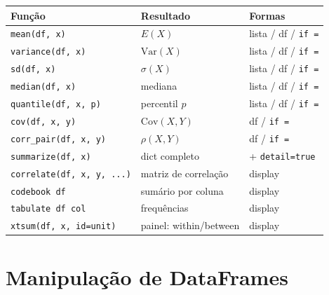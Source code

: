 \begin{center}
\begin{tabular}{lll}
\toprule
\textbf{Função} & \textbf{Resultado} & \textbf{Formas} \\
\midrule
\texttt{mean(df, x)}              & $E(X)$             & lista / df / \texttt{if =} \\
\texttt{variance(df, x)}          & $\mathrm{Var}(X)$  & lista / df / \texttt{if =} \\
\texttt{sd(df, x)}                & $\sigma(X)$        & lista / df / \texttt{if =} \\
\texttt{median(df, x)}            & mediana            & lista / df / \texttt{if =} \\
\texttt{quantile(df, x, p)}       & percentil $p$      & lista / df / \texttt{if =} \\
\texttt{cov(df, x, y)}            & $\mathrm{Cov}(X,Y)$& df / \texttt{if =} \\
\texttt{corr\_pair(df, x, y)}     & $\rho(X,Y)$        & df / \texttt{if =} \\
\texttt{summarize(df, x)}         & dict completo      & + \texttt{detail=true} \\
\texttt{correlate(df, x, y, ...)} & matriz de correlação & display \\
\texttt{codebook df}              & sumário por coluna & display \\
\texttt{tabulate df col}          & frequências        & display \\
\texttt{xtsum(df, x, id=unit)}    & painel: within/between  & display \\
\bottomrule
\end{tabular}
\end{center}

\section{Manipulação de DataFrames}

